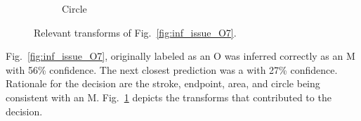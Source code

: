 \documentclass[conference]{IEEEtran}
\begin{document}
\begin{figure}[h]
\begin{subfigure}{.20\columnwidth}
        \caption{Circle}
    \end{subfigure}%
    \caption{Relevant transforms of Fig.~\ref{fig:inf_issue_O7}.}
    \label{fig:o7_trans}
\end{figure}

Fig.~\ref{fig:inf_issue_O7}, originally labeled as an O was inferred correctly
as an M with 56\% confidence. The next closest prediction was a  with 27\%
confidence.  Rationale for the decision are the stroke, endpoint, area,
and circle being consistent with an M. Fig.~\ref{fig:o7_trans} depicts the
transforms that contributed to the decision.
\end{document}
